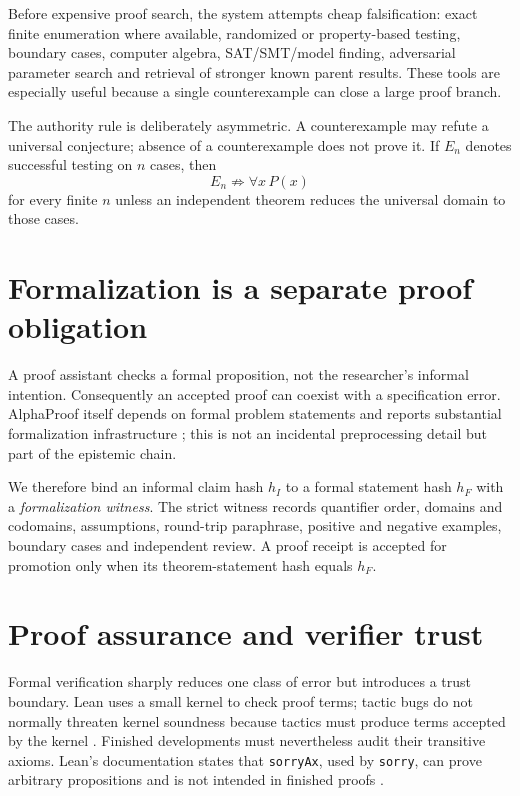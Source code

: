 \documentclass[11pt]{article}
\begin{document}
Before expensive proof search, the system attempts cheap falsification: exact finite enumeration where available, randomized or property-based testing, boundary cases, computer algebra, SAT/SMT/model finding, adversarial parameter search and retrieval of stronger known parent results. These tools are especially useful because a single counterexample can close a large proof branch.

The authority rule is deliberately asymmetric. A counterexample may refute a universal conjecture; absence of a counterexample does not prove it. If $E_n$ denotes successful testing on $n$ cases, then
\[
E_n\not\Rightarrow \forall x\,P(x)
\]
for every finite $n$ unless an independent theorem reduces the universal domain to those cases.

\section{Formalization is a separate proof obligation}

A proof assistant checks a formal proposition, not the researcher's informal intention. Consequently an accepted proof can coexist with a specification error. AlphaProof itself depends on formal problem statements and reports substantial formalization infrastructure \cite{hubert2025}; this is not an incidental preprocessing detail but part of the epistemic chain.

We therefore bind an informal claim hash $h_I$ to a formal statement hash $h_F$ with a \emph{formalization witness}. The strict witness records quantifier order, domains and codomains, assumptions, round-trip paraphrase, positive and negative examples, boundary cases and independent review. A proof receipt is accepted for promotion only when its theorem-statement hash equals $h_F$.

\section{Proof assurance and verifier trust}

Formal verification sharply reduces one class of error but introduces a trust boundary. Lean uses a small kernel to check proof terms; tactic bugs do not normally threaten kernel soundness because tactics must produce terms accepted by the kernel \cite{leanref}. Finished developments must nevertheless audit their transitive axioms. Lean's documentation states that \texttt{sorryAx}, used by \texttt{sorry}, can prove arbitrary propositions and is not intended in finished proofs \cite{leanaxioms}.
\end{document}
